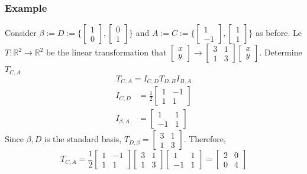 \begin{enumerate}
\subsubsection{Example}
Consider $\beta := D := \{\begin{bmatrix} 1 \\ 0 \end{bmatrix}, 
\begin{bmatrix} 0 \\ 1 \end{bmatrix}\}$ and $A := C := \{\begin{bmatrix}1 \\ -1 \end{bmatrix}, \begin{bmatrix}1 \\ 1\end{bmatrix} \}$ as before. 
Le $T : \mathbb{R}^2 \rightarrow \mathbb{R}^2$ be the linear transformation that $\begin{bmatrix}x \\ y \end{bmatrix} \rightarrow \begin{bmatrix} 
3 & 1 \\ 1 & 3 \end{bmatrix} \begin{bmatrix} x \\ y \end{bmatrix}$. 
Determine $T_{C, A}$
\[
  T_{C, A} = I_{C, D}T_{D, B}I_{B, A} 
\]
\[
  \begin{aligned}
    I_{C, D} &= \frac{1}{2} \begin{bmatrix} 1 & -1 
      \\ 1 & 1 \end{bmatrix} \\
    I_{\beta, A} &= \begin{bmatrix}
    1 & 1 \\ -1 & 1 \end{bmatrix}
  \end{aligned}
\]
Since $\beta, D$ is the standard basis, $T_{D, \beta} = \begin{bmatrix}
3 & 1 \\ 1 & 3 \end{bmatrix}$. Therefore, 
\[T_{C, A} = \frac{1}{2} 
\begin{bmatrix} 1 & -1 \\ 1 & 1 \end{bmatrix} \begin{bmatrix} 3 & 1 
\\ 1 & 3 \end{bmatrix} \begin{bmatrix} 1 & 1 \\ -1 & 1 \end{bmatrix} = 
\begin{bmatrix} 2 & 0 \\ 0 & 4 \end{bmatrix}\]

\end{enumerate}
